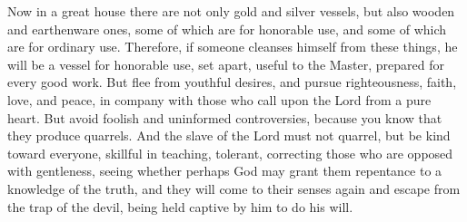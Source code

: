 \begin{biblechapter}
\verse Now in a great house there are not only gold and silver vessels, but also wooden and earthenware ones, some of which are for honorable use, and some of which are for ordinary use.
\verse Therefore, if someone cleanses himself from these things, he will be a vessel for honorable use, set apart, useful to the Master, prepared for every good work.
\verse But flee from youthful desires, and pursue righteousness, faith, love, and peace, in company with those who call upon the Lord from a pure heart.
\verse But avoid foolish and uninformed controversies, because you know that they produce quarrels.
\verse And the slave of the Lord must not quarrel, but be kind toward everyone, skillful in teaching, tolerant,
\verse correcting those who are opposed with gentleness, seeing whether perhaps God may grant them repentance to a knowledge of the truth,
\verse and they will come to their senses again and escape from the trap of the devil, being held captive by him to do his will.
\end{biblechapter}

